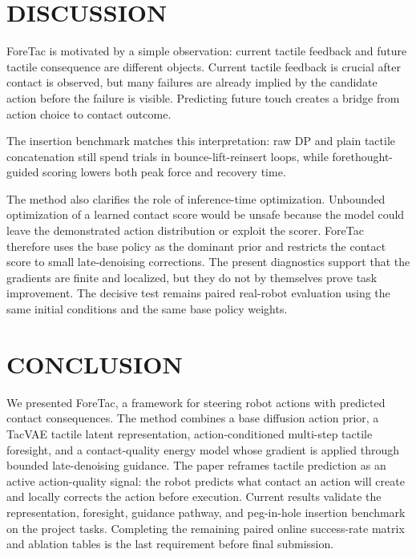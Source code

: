 \documentclass[letterpaper, 10 pt, conference]{ieeeconf}
\newcommand{\method}{ForeTac}
\begin{document}
\section{DISCUSSION}

\method{} is motivated by a simple observation: current tactile feedback and
future tactile consequence are different objects. Current tactile feedback is
crucial after contact is observed, but many failures are already implied by the
candidate action before the failure is visible. Predicting future touch creates
a bridge from action choice to contact outcome.

The insertion benchmark matches this interpretation: raw DP and plain tactile
concatenation still spend trials in bounce-lift-reinsert loops, while
forethought-guided scoring lowers both peak force and recovery time.

The method also clarifies the role of inference-time optimization. Unbounded
optimization of a learned contact score would be unsafe because the model could
leave the demonstrated action distribution or exploit the scorer. \method{}
therefore uses the base policy as the dominant prior and restricts the contact
score to small late-denoising corrections. The present diagnostics support that
the gradients are finite and localized, but they do not by themselves prove
task improvement. The decisive test remains paired real-robot evaluation using
the same initial conditions and the same base policy weights.

\section{CONCLUSION}

We presented \method{}, a framework for steering robot actions with predicted
contact consequences. The method combines a base diffusion action prior, a
TacVAE tactile latent representation, action-conditioned multi-step tactile
foresight, and a contact-quality energy model whose gradient is applied through
bounded late-denoising guidance. The paper reframes tactile prediction as an
active action-quality signal: the robot predicts what contact an action will
create and locally corrects the action before execution. Current results
validate the representation, foresight, guidance pathway, and peg-in-hole
insertion benchmark on the project tasks. Completing the remaining paired
online success-rate matrix and ablation tables is the last requirement before
final submission.



\end{document}
